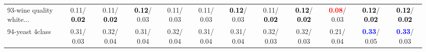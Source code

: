 \begin{table}[h]
\begin{center}
{\begin{tabular}{lc|c|c|c|c|c|c|c|c|c|c}
93-wine quality white... &   0.11/\textcolor{black}{\textbf{  0.02}} &   0.11/\textcolor{black}{\textbf{  0.02}} & \textcolor{black}{\textbf{  0.12}}/  0.03 &   0.11/  0.03 &   0.11/  0.03 & \textcolor{black}{\textbf{  0.12}}/  0.03 &   0.11/\textcolor{black}{\textbf{  0.02}} & \textcolor{black}{\textbf{  0.12}}/\textcolor{black}{\textbf{  0.02}} & \textcolor{red}{\textbf{  0.08}}/  0.03 & \textcolor{black}{\textbf{  0.12}}/\textcolor{black}{\textbf{  0.02}} & \textcolor{black}{\textbf{  0.12}}/\textcolor{black}{\textbf{  0.02}} \\
94-yeast 4class &   0.31/  0.03 &   0.32/  0.04 &   0.31/  0.04 &   0.32/  0.04 &   0.31/  0.04 &   0.31/  0.04 &   0.32/  0.03 &   0.32/  0.03 &   0.21/  0.04 & \textcolor{blue}{\textbf{  0.33}}/  0.05 & \textcolor{blue}{\textbf{  0.33}}/  0.03 \\\end{tabular}}\label{stratsALCKappa2aC4.5}
\end{center}
\end{table}
